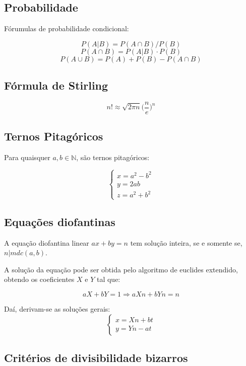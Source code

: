 \documentclass[12pt]{article}
\begin{document}
\subsection*{Probabilidade}

Fórumulas de probabilidade condicional:

$$P(A | B) = P(A \cap B) / P(B)$$
$$P(A \cap B) = P(A|B) \cdot P(B)$$
$$P(A \cup B) = P(A) + P(B) - P(A \cap B)$$

\subsection*{Fórmula de Stirling}

$$ n! \approx \sqrt{2\pi n} \Big(\frac{n}{e}\Big)^n $$

\subsection*{Ternos Pitagóricos}

Para quaisquer $a, b \in \mathbb{N}$, são ternos pitagóricos:

$$ \begin{cases}x = a^2 - b^2 \\ y = 2ab \\ z = a^2 + b^2\end{cases} $$

\subsection*{Equações diofantinas}

A equação diofantina linear $ax + by = n$ tem solução inteira, se e somente se, $n | mdc(a, b)$.

A solução da equação pode ser obtida pelo algoritmo de euclides extendido, obtendo os coeficientes $X$ e $Y$ tal que:

$$aX + bY = 1 \Rightarrow aXn + bYn = n $$

Daí, derivam-se as soluções gerais: 
$$\begin{cases}x = Xn + bt \\ y = Yn - at \end{cases}$$


\subsection*{Critérios de divisibilidade bizarros}
\end{document}
